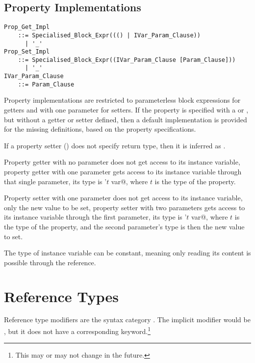 \subsection{Property Implementations}
\label{sec:property-impl}

\begin{lstlisting}[deletekeywords={with}]
Prop_Get_Impl 
    ::= Specialised_Block_Expr((() | IVar_Param_Clause))
      | '_'
Prop_Set_Impl 
    ::= Specialised_Block_Expr((IVar_Param_Clause [Param_Clause]))
      | '_'
IVar_Param_Clause
    ::= Param_Clause
\end{lstlisting}

Property implementations are restricted to parameterless block expressions for getters and with one parameter for setters. If the property is specified with a  or , but without a getter or setter defined, then a default implementation is provided for the missing definitions, based on the property specifications. 

If a property setter () does not specify return type, then it is inferred as . 

Property getter with no parameter does not get access to its instance variable, property getter with one parameter gets access to its instance variable through that single parameter, its type is \lstinline@'$t$ var@, where $t$ is the type of the property.

Property setter with one parameter does not get access to its instance variable, only the new value to be set, property setter with two parameters gets access to its instance variable through the first parameter, its type is \lstinline@'$t$ var@, where $t$ is the type of the property, and the second parameter's type is then the new value to set.

The type of instance variable can be constant, meaning only reading its content is possible through the reference.





\section{Reference Types}
\label{sec:ref-types}

Reference type modifiers are the syntax category . The implicit modifier would be , but it does not have a corresponding keyword.\footnote{This may or may not change in the future.} 

